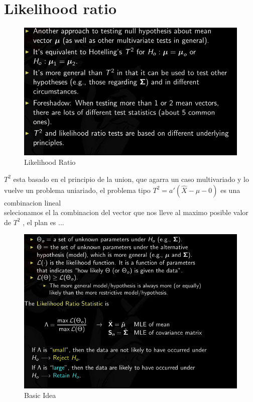 \documentclass[10pt,a4paper]{article} %
\begin{document}
    \section{Likelihood ratio}
        \begin{figure}[h!]
            \centering
            \includegraphics[width=0.8\linewidth]{like.png}
            \caption{Likelihood Ratio }
            \label{fig}
        \end{figure}

        $ T ^{2}   $ esta basado en el principio de la union, que agarra un
        caso multivariado y lo vuelve un problema uniariado, el problema tipo $
        T ^{2} = a'(\hat{X}  - \mu -0)  $  es una combinacion lineal
        \\
        selecionamos el la combinacion del vector que nos lleve al maximo
        posible valor de $ T ^{2}    $ , el plan es ...
        \begin{figure}[h!]
            \centering
            \includegraphics[width=0.8\linewidth]{idea.png}
            \caption{Basic Idea}
            \label{fig}
        \end{figure}
\end{document}
